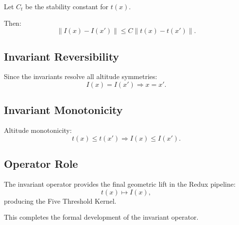 Let $C_t$ be the stability constant for $t(x)$.

Then:
\[
\| I(x) - I(x') \|
\le
C \| t(x) - t(x') \|.
\]

\subsection{Invariant Reversibility}

Since the invariants resolve all altitude symmetries:
\[
I(x) = I(x') \Rightarrow x = x'.
\]

\subsection{Invariant Monotonicity}

Altitude monotonicity:
\[
t(x) \le t(x') \Rightarrow I(x) \le I(x').
\]

\subsection{Operator Role}

The invariant operator provides the final geometric lift in the Redux pipeline:
\[
t(x) \mapsto I(x),
\]
producing the Five Threshold Kernel.

This completes the formal development of the invariant operator.
